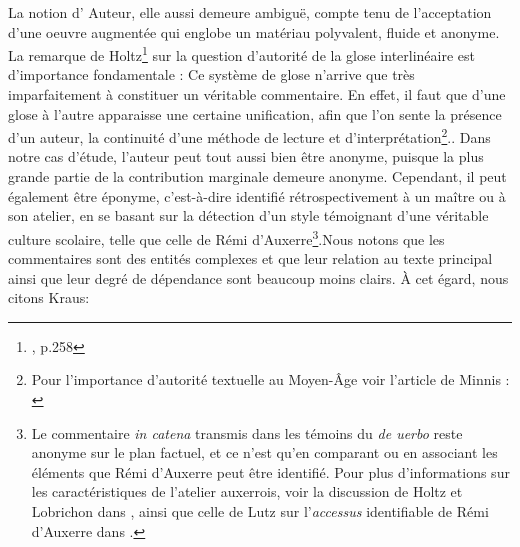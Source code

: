 \documentclass[a4paper, twoside, 12pt]{book}
\begin{document}
La notion d'  \og{}Auteur\fg{}, elle aussi demeure ambiguë, compte tenu de l'acceptation d'une \og{}oeuvre augmentée\fg{} qui englobe un matériau polyvalent, fluide et anonyme. La remarque de Holtz\footnote{\cite{holtz1978typologie}, p.258} sur la question d'autorité de la glose interlinéaire est d'importance fondamentale : \og{} Ce système de glose n'arrive que très imparfaitement à constituer un véritable commentaire. En effet, il faut que d'une glose à l'autre apparaisse une certaine unification, afin que l'on sente la présence d'un auteur, la continuité d'une méthode de lecture et d'interprétation\footnote{Pour l'importance d'autorité textuelle au Moyen-Âge voir l'article de Minnis : \cite{minnis1988significance}}.\fg{}. Dans notre cas d'étude, l'auteur peut tout aussi bien être anonyme, puisque la plus grande partie de la contribution marginale demeure anonyme. Cependant, il peut également être \og{}éponyme\fg{}, c'est-à-dire identifié rétrospectivement à un maître ou à son atelier, en se basant sur la détection d'un style témoignant d'une véritable culture scolaire, telle que celle de Rémi d'Auxerre\footnote{Le commentaire \textit{in catena} transmis dans les témoins du \textit{de uerbo} reste anonyme sur le plan factuel, et ce n'est qu'en comparant ou en associant les éléments que Rémi d'Auxerre peut être identifié. Pour plus d'informations sur les caractéristiques de l'atelier auxerrois, voir la discussion de Holtz et Lobrichon dans \cite{iogna1991ecole}, ainsi que celle de Lutz sur l'\textit{accessus} identifiable de Rémi d'Auxerre dans \cite{lutz1960one}.}.Nous notons que les commentaires sont des entités complexes et que leur relation au texte principal ainsi que leur degré de dépendance sont beaucoup moins clairs. À cet égard, nous citons Kraus: 
\end{document}
